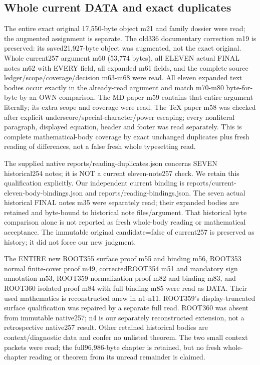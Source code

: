 \documentclass[11pt]{article}
\begin{document}
\subsection*{Whole current DATA and exact duplicates}

The entire exact original 17,550-byte object m21 and family dossier were read; the augmented assignment is separate. The old336 documentary correction m19 is preserved: its saved21,927-byte object was augmented, not the exact original. Whole current257 argument m60 (53,774 bytes), all ELEVEN actual FINAL notes m62 with EVERY field, all expanded m61 fields, and the complete source ledger/scope/coverage/decision m63-m68 were read. All eleven expanded text bodies occur exactly in the already-read argument and match m70-m80 byte-for-byte by an OWN comparison. The MD paper m59 contains that entire argument literally; its extra scope and coverage were read. The TeX paper m58 was checked after explicit underscore/special-character/power escaping; every nonliteral paragraph, displayed equation, header and footer was read separately. This is complete mathematical-body coverage by exact unchanged duplicates plus fresh reading of differences, not a false fresh whole typesetting read.

The supplied native reports/reading-duplicates.json concerns SEVEN historical254 notes; it is NOT a current eleven-note257 check. We retain this qualification explicitly. Our independent current binding is reports/current-eleven-body-bindings.json and reports/reading-bindings.json. The seven actual historical FINAL notes m35 were separately read; their expanded bodies are retained and byte-bound to historical note files/argument. That historical byte comparison alone is not reported as fresh whole-body reading or mathematical acceptance. The immutable original candidate=false of current257 is preserved as history; it did not force our new judgment.

The ENTIRE new ROOT355 surface proof m55 and binding m56, ROOT353 normal finite-cover proof m49, correctedROOT354 m51 and mandatory sign annotation m53, ROOT359 normalization proof m82 and binding m83, and ROOT360 isolated proof m84 with full binding m85 were read as DATA. Their used mathematics is reconstructed anew in n1-n11. ROOT359's display-truncated surface qualification was repaired by a separate full read. ROOT360 was absent from immutable native257; n4 is our separately reconstructed extension, not a retrospective native257 result. Other retained historical bodies are context/diagnostic data and confer no unlisted theorem. The two small context packets were read; the full96,986-byte chapter is retained, but no fresh whole-chapter reading or theorem from its unread remainder is claimed.
\end{document}
